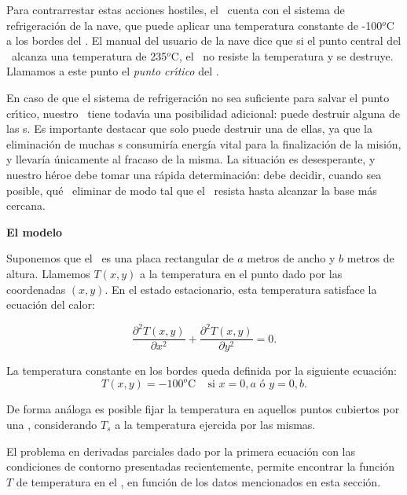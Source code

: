 Para con\-tra\-rres\-tar estas acciones hostiles, el \capitan\ cuenta con el sistema de refrigeraci\'on de la nave, que puede aplicar una temperatura constante de -100${}^o$C a los bordes del \objeto.
El manual del usuario de la nave dice que si el punto central del \objeto\ 
alcanza una temperatura de 235${}^o$C, el \objeto\ no resiste la temperatura
y se destruye. Llamamos a este punto el \emph{punto cr\'\i tico} del
\objeto.

En caso de que el sistema de refrigeraci\'on no sea suficiente para salvar
el punto cr\'\i tico, nues\-tro \capitan\ tiene todav\'\i a una posibilidad
adicional: puede des\-tru\-ir alguna de las \atacante s. Es importante destacar que solo puede destruir una de ellas, ya que la eliminaci\'on de muchas \atacante s consumir\'ia  energ\'ia vital para la finalizaci\'on  de la misi\'on, y llevar\'ia \'unicamente al fracaso de la misma.
La situaci\'on es desesperante, y nuestro h\'eroe debe tomar una r\'apida
determinaci\'on: debe decidir, cuando sea posible, qu\'e \atacante\ eliminar de modo tal que el \objeto\ resista hasta alcanzar la base m\'as cercana.

{\noindent \bf El modelo}

Suponemos que el \objeto\ es una placa rectangular de $a$ metros de ancho y $b$ metros de altura. Llamemos $T(x,y)$ a la temperatura en el punto dado por las coordenadas $(x,y)$. En el estado estacionario, esta temperatura satisface la ecuaci\'on del calor:

\begin{equation}\label{eq:calor}
\frac{\partial^2T(x,y)}{\partial x^{2}}+\frac{\partial^2 T(x,y)}{\partial y^{2}} = 0.
\end{equation}

\noindent La temperatura constante en los bordes queda definida por la siguiente ecuaci\'on:
\begin{equation}
T(x,y) = -100^o\textrm{C}~~~~~\textrm{si } x = 0,a \textrm{ \'o } y = 0,b.
\label{eq:borde}
\end{equation}

\noindent De forma an\'aloga es posible fijar la temperatura en aquellos puntos cubiertos por una \atacante, considerando $T_s$ a la temperatura ejercida por las mismas.

El problema en derivadas parciales dado por la primera ecuaci\'on con las condiciones de contorno presentadas recientemente, permite encontrar la funci\'on $T$ de temperatura en el \objeto, en funci\'on de los datos mencionados en esta secci\'on.

